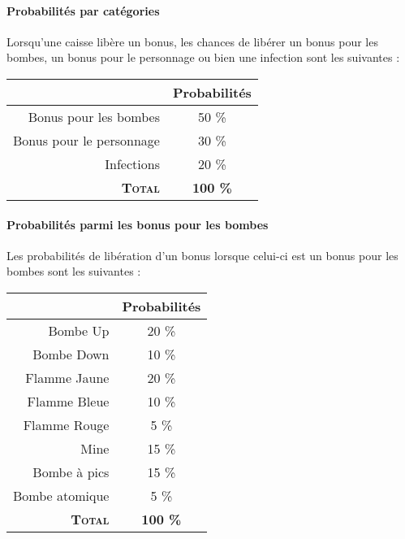 \paragraph{Probabilités par catégories}
Lorsqu'une caisse libère un bonus, les chances de libérer un bonus pour les bombes, un bonus pour le personnage ou bien une infection sont les suivantes :

\begin{center}
\begin{tabular}{|r|c|}
\hline 
& Probabilités \\ 
\hline 
Bonus pour les bombes & 50 \% \\ 
\hline 
Bonus pour le personnage & 30 \% \\ 
\hline 
Infections & 20 \% \\ 
\hline 
\textbf{\textsc{Total}} & \textbf{100 \%} \\ 
\hline 
\end{tabular} 
\end{center}

\paragraph{Probabilités parmi les bonus pour les bombes}
Les probabilités de libération d'un bonus lorsque celui-ci est un bonus pour les bombes sont les suivantes :
\begin{center}
\begin{tabular}{|r|c|}
\hline 
& Probabilités \\ 
\hline 
Bombe Up & 20 \% \\ 
\hline 
Bombe Down & 10 \% \\ 
\hline 
Flamme Jaune & 20 \% \\ 
\hline 
Flamme Bleue & 10 \% \\ 
\hline 
Flamme Rouge & 5 \% \\ 
\hline 
Mine & 15 \% \\ 
\hline 
Bombe à pics & 15 \% \\ 
\hline 
Bombe atomique & 5 \% \\ 
\hline 
\textbf{\textsc{Total}} & \textbf{100 \%} \\ 
\hline 
\end{tabular} 
\end{center}

